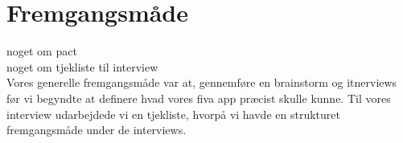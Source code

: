 \documentclass[12pt]{article}
\begin{document}

\clearpage\maketitle
\thispagestyle{empty}

\newpage

\tableofcontents %

\thispagestyle{empty}

\newpage
\pagestyle{plain}
\setcounter{page}{1}

\section{Fremgangsmåde}
noget om pact\\
noget om tjekliste til interview\\
Vores generelle fremgangsmåde var at, gennemføre en brainstorm og itnerviews før vi begyndte at definere hvad vores fiva app præcist skulle kunne. Til vores interview udarbejdede vi en tjekliste, hvorpå vi havde en strukturet fremgangsmåde under de interviews.\\
\end{document}
